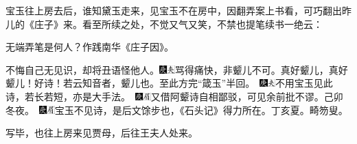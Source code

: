 {宝玉往上房去后，谁知黛玉走来，见宝玉不在房中，因翻弄案上书看，可巧翻出昨儿的《庄子》来。看至所续之处，不觉又气又笑，不禁也提笔续书一绝云：

无端弄笔是何人？作践南华《庄子因》。

不悔自己无见识，却将丑语怪他人。{\includegraphics[width=3mm]{../Images/00004}\includegraphics[width=3mm]{../Images/00012}\footnotesize \kaishu 骂得痛快，非颦儿不可。真好颦儿，真好颦儿！好诗！若云知音者，颦儿也。至此方完“箴玉”半回。　{\includegraphics[width=3mm]{../Images/00004}\includegraphics[width=3mm]{../Images/00012}\footnotesize \kaishu 不用宝玉见此诗，若长若短，亦是大手法。　\includegraphics[width=3mm]{../Images/00004}\includegraphics[width=3mm]{../Images/00010}\footnotesize \kaishu 又借阿颦诗自相鄙驳，可见余前批不谬。己卯冬夜。　\includegraphics[width=3mm]{../Images/00004}\includegraphics[width=3mm]{../Images/00010}\footnotesize \kaishu 宝玉不见诗，是后文馀步也，《石头记》得力所在。丁亥夏。畸笏叟。}}

写毕，也往上房来见贾母，后往王夫人处来。

}
